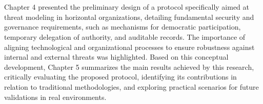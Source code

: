 \section*{}
Chapter 4 presented the preliminary design of a protocol specifically aimed at
threat modeling in horizontal organizations, detailing fundamental security and
governance requirements, such as mechanisms for democratic participation,
temporary delegation of authority, and auditable records. The importance of
aligning technological and organizational processes to ensure robustness against
internal and external threats was highlighted. Based on this conceptual
development, Chapter 5 summarizes the main results achieved by this research,
critically evaluating the proposed protocol, identifying its contributions in
relation to traditional methodologies, and exploring practical scenarios for
future validations in real environments.
